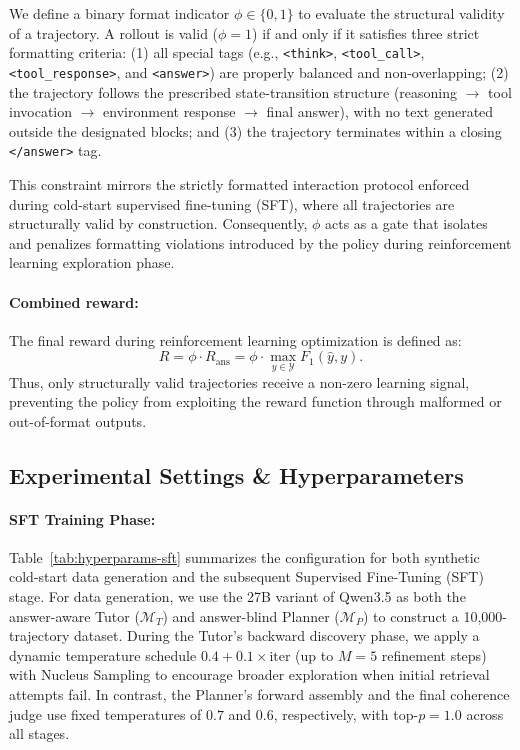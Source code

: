 \documentclass{llmxive}
\begin{document}
We define a binary format indicator $\phi \in \{0,1\}$ to evaluate the structural validity of a trajectory. A rollout is valid ($\phi=1$) if and only if it satisfies three strict formatting criteria:
(1) all special tags (e.g., \texttt{<think>}, \texttt{<tool\_call>}, \texttt{<tool\_response>}, and \texttt{<answer>}) are properly balanced and non-overlapping;
(2) the trajectory follows the prescribed state-transition structure (reasoning $\rightarrow$ tool invocation $\rightarrow$ environment response $\rightarrow$ final answer), with no text generated outside the designated blocks; and
(3) the trajectory terminates within a closing \texttt{</answer>} tag.

This constraint mirrors the strictly formatted interaction protocol enforced during cold-start supervised fine-tuning (SFT), where all trajectories are structurally valid by construction. Consequently, $\phi$ acts as a gate that isolates and penalizes formatting violations introduced by the policy during reinforcement learning exploration phase.



\paragraph{Combined reward:}

The final reward during reinforcement learning optimization is defined as:
\begin{equation}
R = \phi \cdot R_{\mathrm{ans}}
  = \phi \cdot \max_{y \in \mathcal{Y}} F_1(\hat{y}, y).
\end{equation}
Thus, only structurally valid trajectories receive a non-zero learning signal, preventing the policy from exploiting the reward function through malformed or out-of-format outputs.


\subsection{Experimental Settings \& Hyperparameters}
\label{app:experimental-setting}



\paragraph{SFT Training Phase:} 

Table~\ref{tab:hyperparams-sft} summarizes the configuration for both synthetic cold-start data generation and the subsequent Supervised Fine-Tuning (SFT) stage. For data generation, we use the 27B variant of Qwen3.5 as both the answer-aware Tutor ($\mathcal{M}_T$) and answer-blind Planner ($\mathcal{M}_P$) to construct a 10,000-trajectory dataset. During the Tutor’s backward discovery phase, we apply a dynamic temperature schedule $0.4 + 0.1 \times \text{iter}$ (up to $M=5$ refinement steps) with Nucleus Sampling \citep{Holtzman2020The} to encourage broader exploration when initial retrieval attempts fail. In contrast, the Planner’s forward assembly and the final coherence judge use fixed temperatures of $0.7$ and $0.6$, respectively, with top-$p=1.0$ across all stages.
\end{document}
